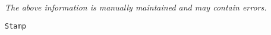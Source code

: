 \label{pkg:stamp}

{\tiny \it The above information is manually maintained and may contain errors.}
\begin{verbatim}
Stamp
\end{verbatim}
